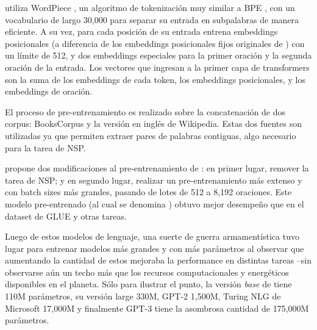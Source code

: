\bert{} utiliza WordPiece \cite{wu2016google}, un algoritmo de tokenización muy similar a BPE \cite{sennrich2016neural}, con un vocabulario de largo 30,000 para separar su entrada en subpalabras de manera eficiente. A su vez, para cada posición de su entrada entrena embeddings posicionales (a diferencia de los embeddings posicionales fijos originales de \citet{vaswani2017attention}) con un límite de 512, y dos embeddings especiales para la primer oración y la segunda oración de la entrada. Los vectores que ingresan a la primer capa de transformers son la suma de los embeddings de cada token, los embeddings posicionales, y los embeddings de oración.

El proceso de pre-entrenamiento es realizado sobre la concatenación de dos corpus: BooksCorpus \cite{zhu2015bookscorpus} y la versión en inglés de Wikipedia. Estas dos fuentes son utilizadas ya que permiten extraer pares de palabras contiguas, algo necesario para la tarea de NSP.


\citet{liu2019roberta} propone dos modificaciones al pre-entrenamiento de \bert{}: en primer lugar, remover la tarea de NSP; y en segundo lugar, realizar un pre-entrenamiento más extenso y con batch sizes más grandes, pasando de lotes de 512 a 8,192 oraciones. Este modelo pre-entrenado (al cual se denomina \roberta{}) obtuvo mejor desempeño que \bert{} en el dataset de GLUE y otras tareas.

Luego de estos modelos de lenguaje, una suerte de guerra armamentística tuvo lugar para entrenar modelos más grandes y con más parámetros al observar que aumentando la cantidad de estos mejoraba la performance en distintas tareas --sin observarse aún un techo más que los recursos computacionales y energéticos disponibles en el planeta. Sólo para ilustrar el punto, la versión \emph{base} de \bert{} tiene 110M parámetros, su versión large 330M, GPT-2 1,500M, Turing NLG de Microsoft 17,000M y finalmente GPT-3 \cite{brown2020language} tiene la asombrosa cantidad de 175,000M parámetros.